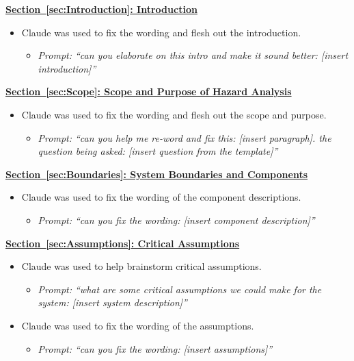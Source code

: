 \documentclass{article}
\begin{document}
\textbf{\hyperref[sec:Introduction]{Section~\ref*{sec:Introduction}: Introduction}}
\begin{itemize}
  \item Claude was used to fix the wording and flesh out the introduction.
  \begin{itemize}
    \item \textit{Prompt: ``can you elaborate on this intro and make it sound better: [insert introduction]''}
  \end{itemize}
\end{itemize}

\textbf{\hyperref[sec:Scope]{Section~\ref*{sec:Scope}: Scope and Purpose of Hazard Analysis}}
\begin{itemize}
  \item Claude was used to fix the wording and flesh out the scope and purpose.
  \begin{itemize}
    \item \textit{Prompt: ``can you help me re-word and fix this: [insert paragraph]. the question being asked: [insert question from the template]''}
  \end{itemize}
\end{itemize}

\textbf{\hyperref[sec:Boundaries]{Section~\ref*{sec:Boundaries}: System Boundaries and Components}}
\begin{itemize}
  \item Claude was used to fix the wording of the component descriptions.
  \begin{itemize}
    \item \textit{Prompt: ``can you fix the wording: [insert component description]''}
  \end{itemize}
\end{itemize}

\textbf{\hyperref[sec:Assumptions]{Section~\ref*{sec:Assumptions}: Critical Assumptions}}
\begin{itemize}
  \item Claude was used to help brainstorm critical assumptions.
  \begin{itemize}
    \item \textit{Prompt: ``what are some critical assumptions we could make for the system: [insert system description]''}
  \end{itemize}
  \item Claude was used to fix the wording of the assumptions.
  \begin{itemize}
    \item \textit{Prompt: ``can you fix the wording: [insert assumptions]''}
  \end{itemize}
\end{itemize}
\end{document}
